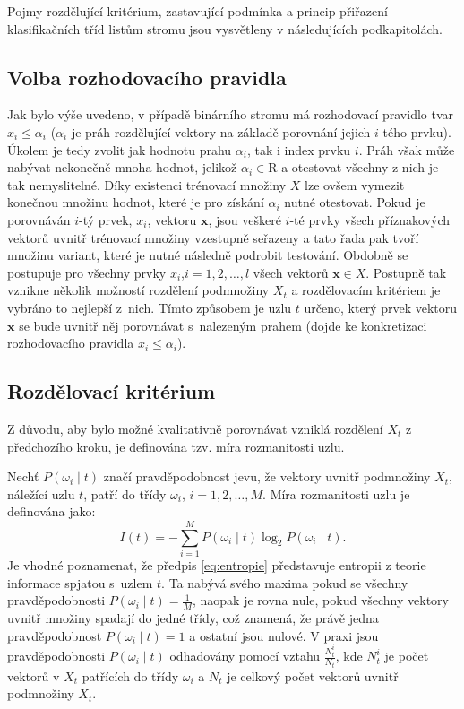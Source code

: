 {\par{Pojmy rozdělující kritérium, zastavující podmínka a princip přiřazení klasifikačních tříd listům stromu jsou vysvětleny v následujících podkapitolách.}

\subsection*{Volba rozhodovacího pravidla}
\par{Jak bylo výše uvedeno, v případě binárního stromu má rozhodovací pravidlo tvar $x_i\leq\alpha_i$ ($\alpha_i$ je práh rozdělující vektory na základě porovnání jejich $i$-tého prvku). Úkolem je tedy zvolit jak hodnotu prahu $\alpha_i$, tak i index prvku $i$. Práh však může nabývat nekonečně mnoha hodnot, jelikož $\alpha_i\in\mathrm{R}$ a otestovat všechny z nich je tak nemyslitelné. Díky existenci trénovací množiny $X$ lze ovšem vymezit konečnou množinu hodnot, které je pro získání $\alpha_i$ nutné otestovat. Pokud je porovnáván $i$-tý prvek, $x_i$, vektoru $\bm{x}$, jsou veškeré $i$-té prvky všech příznakových vektorů uvnitř trénovací množiny vzestupně seřazeny a tato řada pak tvoří množinu variant, které je nutné následně podrobit testování. Obdobně se postupuje pro všechny prvky $x_i$,$i=1,2,\ldots ,l$ všech vektorů $\bm{x}\in X$. Postupně tak vznikne několik možností rozdělení podmnožiny $X_t$ a rozdělovacím kritériem je vybráno to nejlepší z~nich. Tímto způsobem je uzlu $t$ určeno, který prvek vektoru $\bm{x}$ se bude uvnitř něj porovnávat s~nalezeným prahem (dojde ke konkretizaci rozhodovacího pravidla $x_i\leq\alpha_i$).}

\subsection*{Rozdělovací kritérium}
\par{Z důvodu, aby bylo možné kvalitativně porovnávat vzniklá rozdělení $X_t$ z předchozího kroku, je definována tzv. míra rozmanitosti uzlu.}

\par{Nechť $P\left(\omega_i\mid t\right)$ značí pravděpodobnost jevu, že vektory uvnitř podmnožiny $X_t$, náležící uzlu $t$, patří do třídy $\omega_i$, $i=1,2,\ldots ,M$. Míra rozmanitosti uzlu je definována jako:
\begin{equation}
	{I\left( t\right) = -\sum_{i=1}^{M} P\left(\omega_i\mid t\right)\log_2 P\left(\omega_i\mid t\right).} \label{eq:entropie}
\end{equation}
Je vhodné poznamenat, že předpis \ref{eq:entropie} představuje entropii z teorie informace spjatou s~uzlem $t$. Ta nabývá svého maxima pokud se všechny pravděpodobnosti $P\left(\omega_i\mid t\right)=\frac{1}{M}$, naopak je rovna nule, pokud všechny vektory uvnitř množiny spadají do jedné třídy,
což znamená, že právě jedna pravděpodobnost $P\left(\omega_i\mid t\right)=1$ a ostatní jsou nulové. V praxi jsou pravděpodobnosti $P\left(\omega_i\mid t\right)$ odhadovány pomocí vztahu $\frac{N_t^i}{N_t}$, kde $N_t^i$ je počet vektorů v $X_t$ patřících do třídy $\omega_i$ a $N_t$ je celkový počet vektorů uvnitř podmnožiny $X_t$.}

}
